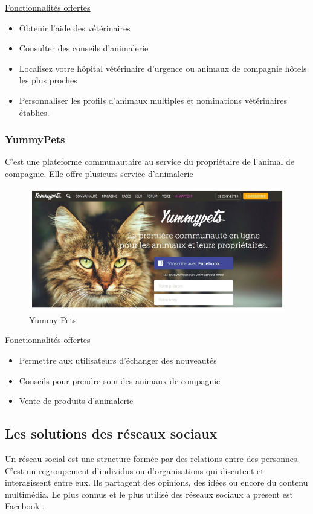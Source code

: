 \documentclass[11pt,a4paper,oneside]{book}
\begin{document}
	
	
	\underline{Fonctionnalités offertes}
	\begin{itemize}
		\item Obtenir l’aide des vétérinaires
		\item Consulter des conseils d’animalerie
		\item Localisez votre hôpital vétérinaire d'urgence ou animaux de compagnie hôtels les plus proches
		\item Personnaliser les profils d'animaux multiples et nominations vétérinaires établies.
	\end{itemize}
	\subsubsection{YummyPets}
	C’est une plateforme communautaire au service du propriétaire de l'animal de compagnie. Elle offre plusieurs service d’animalerie\\
	\begin{figure}[H]
		\centering
		\includegraphics[width=1\textwidth]{Images/Ch1/Yummy-pet}
		\caption{Yummy Pets}
		\label{fig:yummy-pet}
	\end{figure}
	
	\underline{Fonctionnalités offertes}
	\begin{itemize}
		\item Permettre aux utilisateurs d’échanger des nouveautés
		\item Conseils pour prendre soin des animaux de compagnie
		\item Vente de produits d’animalerie
	\end{itemize}
	\subsection{Les solutions des réseaux sociaux}
	\begin{flushleft}
		Un réseau social est une structure formée par des relations entre des personnes. C’est un regroupement d’individus ou d’organisations qui discutent et interagissent entre eux. Ils partagent des opinions, des idées ou encore du contenu multimédia.
		Le plus connus et le plus utilisé des réseaux sociaux a present est Facebook 
		.
	\end{flushleft}
	
\end{document}
